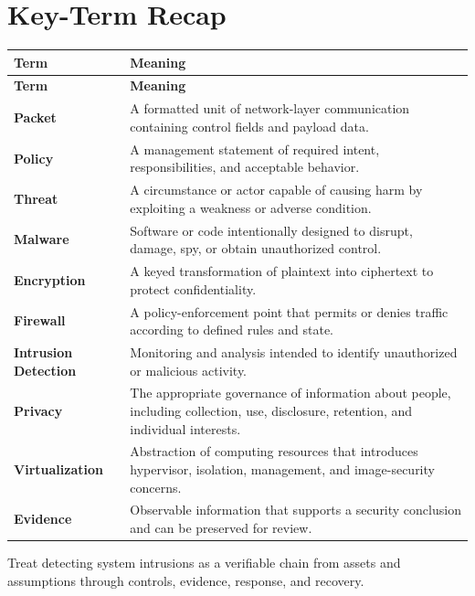 \documentclass[11pt]{article}
\begin{document}
\section*{Key-Term Recap}
\begin{longtable}{>{\RaggedRight\arraybackslash}p{}>{\RaggedRight\arraybackslash}p{}}
\toprule\rowcolor{Navy}\color{white}\textbf{Term} & \color{white}\textbf{Meaning}\\\midrule
\endfirsthead
\toprule\rowcolor{Navy}\color{white}\textbf{Term} & \color{white}\textbf{Meaning}\\\midrule
\endhead
\textbf{Packet} & A formatted unit of network-layer communication containing control fields and payload data. \\\midrule
\textbf{Policy} & A management statement of required intent, responsibilities, and acceptable behavior. \\\midrule
\textbf{Threat} & A circumstance or actor capable of causing harm by exploiting a weakness or adverse condition. \\\midrule
\textbf{Malware} & Software or code intentionally designed to disrupt, damage, spy, or obtain unauthorized control. \\\midrule
\textbf{Encryption} & A keyed transformation of plaintext into ciphertext to protect confidentiality. \\\midrule
\textbf{Firewall} & A policy-enforcement point that permits or denies traffic according to defined rules and state. \\\midrule
\textbf{Intrusion Detection} & Monitoring and analysis intended to identify unauthorized or malicious activity. \\\midrule
\textbf{Privacy} & The appropriate governance of information about people, including collection, use, disclosure, retention, and individual interests. \\\midrule
\textbf{Virtualization} & Abstraction of computing resources that introduces hypervisor, isolation, management, and image-security concerns. \\\midrule
\textbf{Evidence} & Observable information that supports a security conclusion and can be preserved for review. \\\midrule
\bottomrule
\end{longtable}
\begin{takeawaybox}
Treat detecting system intrusions as a verifiable chain from assets and assumptions through controls, evidence, response, and recovery.
\end{takeawaybox}
\end{document}
